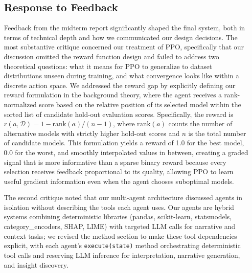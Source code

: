 \documentclass{article}
\begin{document}
\subsection{Response to Feedback}
\label{sec:feedback}

Feedback from the midterm report significantly shaped the final system, both in terms of technical depth and how we communicated our design decisions. The most substantive critique concerned our treatment of PPO, specifically that our discussion omitted the reward function design and failed to address two theoretical questions: what it means for PPO to generalize to dataset distributions unseen during training, and what convergence looks like within a discrete action space. We addressed the reward gap by explicitly defining our reward formulation in the background theory, where the agent receives a rank-normalized score based on the relative position of its selected model within the sorted list of candidate hold-out evaluation scores. Specifically, the reward is $r(a, \mathcal{D}) = 1 - \text{rank}(a)/(n-1)$, where $\text{rank}(a)$ counts the number of alternative models with strictly higher hold-out scores and $n$ is the total number of candidate models. This formulation yields a reward of 1.0 for the best model, 0.0 for the worst, and smoothly interpolated values in between, creating a graded signal that is more informative than a sparse binary reward because every selection receives feedback proportional to its quality, allowing PPO to learn useful gradient information even when the agent chooses suboptimal models.


The second critique noted that our multi-agent architecture discussed agents in isolation without describing the tools each agent uses. Our agents are hybrid systems combining deterministic libraries (pandas, scikit-learn, statsmodels, category\_encoders, SHAP, LIME) with targeted LLM calls for narrative and context tasks; we revised the method section to make these tool dependencies explicit, with each agent's \texttt{execute(state)} method orchestrating deterministic tool calls and reserving LLM inference for interpretation, narrative generation, and insight discovery.
\end{document}
